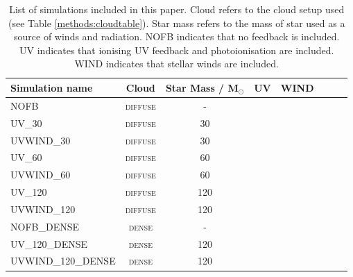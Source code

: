 \documentclass[a4paper,fleqn,usenatbib]{mnras}
\newcommand{\Msolar}{M$_{\odot}$\xspace}
\newcommand{\tick}{\hspace{1pt}\ding{51}}
\newcommand{\cross}{\hspace{1pt}\ding{55}}
\begin{document}
\begin{table}
	\centering
	\caption{List of simulations included in this paper. Cloud refers to the cloud setup used (see Table \ref{methods:cloudtable}). Star mass refers to the mass of star used as a source of winds and radiation. NOFB indicates that no feedback is included. UV indicates that ionising UV feedback and photoionisation are included. WIND indicates that stellar winds are included.}
	\label{methods:simtable}
	\begin{tabular}{lccccccc} %
		\hline
		Simulation name     & Cloud             & Star Mass / \Msolar & UV     & WIND \\
		\hline
		\hline
		NOFB                & \textsc{diffuse}  & -                   & \cross & \cross \\
		\hline
		UV\_30              & \textsc{diffuse}  & 30                  & \tick  & \cross \\
		UVWIND\_30          & \textsc{diffuse}  & 30                  & \tick  & \tick  \\
		\hline
		UV\_60              & \textsc{diffuse}  & 60                  & \tick  & \cross \\
		UVWIND\_60          & \textsc{diffuse}  & 60                  & \tick  & \tick  \\
		\hline
		UV\_120             & \textsc{diffuse}  & 120                 & \tick  & \cross \\
		UVWIND\_120         & \textsc{diffuse}  & 120                 & \tick  & \tick  \\
		\hline
		NOFB\_DENSE         & \textsc{dense}    & -                   & \cross & \cross \\
		\hline
		UV\_120\_DENSE      & \textsc{dense}    & 120                 & \tick  & \cross \\
		UVWIND\_120\_DENSE  & \textsc{dense}    & 120                 & \tick  & \tick  \\
		\hline
	\end{tabular}
\end{table}
\end{document}
